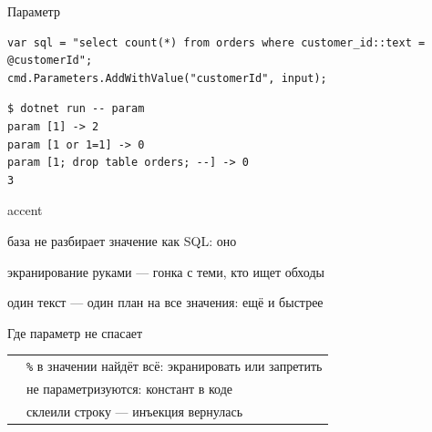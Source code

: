 \documentclass[aspectratio=169,10pt,t]{beamer}
\newcommand{\codesm}{\ttfamily\fontsize{7.6}{9.0}\selectfont}
\newcommand{\termsm}{\ttfamily\fontsize{6.6}{7.9}\selectfont}
\begin{document}
\begin{frame}[fragile]{Параметр}
  \slidetop

\begin{lstlisting}[style=csharp,basicstyle=\codesm]
var sql = "select count(*) from orders where customer_id::text = @customerId";
cmd.Parameters.AddWithValue("customerId", input);
\end{lstlisting}

\begin{lstlisting}[style=term,basicstyle=\termsm]
$ dotnet run -- param
param [1] -> 2
param [1 or 1=1] -> 0
param [1; drop table orders; --] -> 0
3
\end{lstlisting}

  \begin{cbul}{accent}
    \item база не разбирает значение как SQL: оно 
    \item экранирование руками --- гонка с теми, кто ищет обходы
    \item один текст --- один план на все значения: ещё и быстрее
  \end{cbul}
\end{frame}

\begin{frame}[plain]
\end{frame}

\begin{frame}{Где параметр не спасает}
  \slidetop
  {\renewcommand{\arraystretch}{1.6}
  \begin{tabular}{@{}L{4.4cm}L{8.4cm}@{}}
        & \texttt{\%} в значении найдёт всё:
      экранировать или запретить \\
      & не параметризуются: 
      констант в коде \\
             & склеили строку --- инъекция
      вернулась \\
  \end{tabular}}

  \slidegap
\end{frame}

\begin{frame}[plain]
\end{frame}
\end{document}
